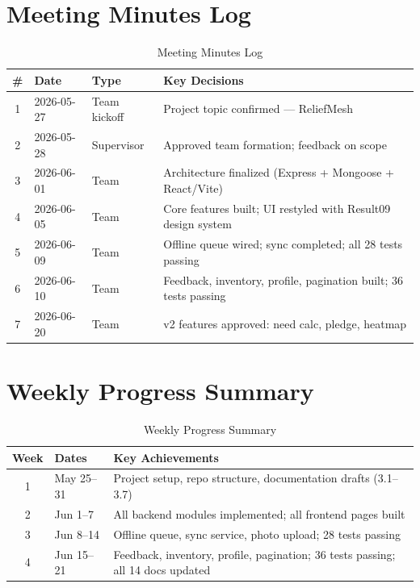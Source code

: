 
\section{Meeting Minutes Log}
\begin{table}[H]
\centering
\caption{Meeting Minutes Log}
\label{tab:meetings}
\begin{tabularx}{\textwidth}{@{}cllX@{}}
\toprule
\# & Date & Type & Key Decisions \\
\midrule
1 & 2026-05-27 & Team kickoff & Project topic confirmed --- ReliefMesh \\
2 & 2026-05-28 & Supervisor & Approved team formation; feedback on scope \\
3 & 2026-06-01 & Team & Architecture finalized (Express + Mongoose + React/Vite) \\
4 & 2026-06-05 & Team & Core features built; UI restyled with Result09 design system \\
5 & 2026-06-09 & Team & Offline queue wired; sync completed; all 28 tests passing \\
6 & 2026-06-10 & Team & Feedback, inventory, profile, pagination built; 36 tests passing \\
7 & 2026-06-20 & Team & v2 features approved: need calc, pledge, heatmap \\
\bottomrule
\end{tabularx}
\end{table}

\section{Weekly Progress Summary}
\begin{table}[H]
\centering
\caption{Weekly Progress Summary}
\label{tab:weekly}
\begin{tabularx}{\textwidth}{@{}clX@{}}
\toprule
Week & Dates & Key Achievements \\
\midrule
1 & May 25--31 & Project setup, repo structure, documentation drafts (3.1--3.7) \\
2 & Jun 1--7 & All backend modules implemented; all frontend pages built \\
3 & Jun 8--14 & Offline queue, sync service, photo upload; 28 tests passing \\
4 & Jun 15--21 & Feedback, inventory, profile, pagination; 36 tests passing; all 14 docs updated \\
\bottomrule
\end{tabularx}
\end{table}

